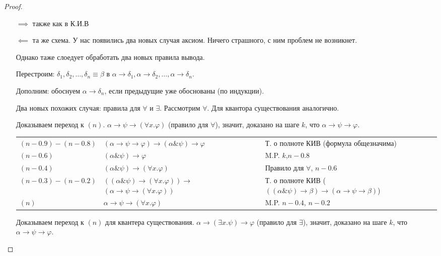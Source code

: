 \begin{proof}
    \begin{itemize}
        \item []
        \item [$\implies $] также как в К.И.В
        \item [$\impliedby $] та же схема. У нас появились два новых случая аксиом. Ничего страшного, с ним проблем не возникнет.

Однако таже слоедует обработать два новых правила вывода.

Перестроим: $\delta_1, \delta_2, \dots, \delta_n \equiv \beta$ в $\alpha\rightarrow\delta_1, \alpha\rightarrow\delta_2, \dots, \alpha\rightarrow\delta_n$.

Дополним: обоснуем $\alpha\rightarrow\delta_n$, если предыдущие уже обоснованы (по индукции).

Два новых похожих случая: правила для $\forall$ и $\exists$. Рассмотрим $\forall$. Для квантора существования аналогично.

Доказываем переход к $(n)$. $\alpha\rightarrow\psi\rightarrow(\forall x.\varphi)$ (правило для $\forall$), значит, доказано
на шаге $k$, что $\alpha\rightarrow\psi\rightarrow\varphi$.

\begin{tabular}[t]{p{2.8cm} p{4.6cm} p{7cm}}
$(n-0.9)-(n-0.8)$ &
$(\alpha\rightarrow\psi\rightarrow\varphi)\rightarrow(\alpha\&\psi)\rightarrow\varphi$ & Т. о полноте КИВ (формула общезначима)\\
$(n-0.6)$ & $(\alpha \& \psi)\rightarrow\varphi$ & M.P. $k$,$n-0.8$\\
$(n-0.4)$ & $(\alpha \& \psi)\rightarrow(\forall x.\varphi)$ & Правило для $\forall$, $n-0.6$\\
\parbox{2.8cm}{$(n-0.3)-(n-0.2)$\\} & \parbox{4.6cm}{$((\alpha\&\psi)\rightarrow(\forall x.\varphi))\rightarrow$\\$(\alpha\rightarrow\psi\rightarrow(\forall x.\varphi))$} & \parbox{7cm}{Т. о полноте КИВ \\($((\alpha\&\psi)\rightarrow\beta)\rightarrow(\alpha\rightarrow\psi\rightarrow\beta)$)}\\
$(n)$ & $\alpha\rightarrow\psi\rightarrow(\forall x.\varphi)$ & M.P. $n-0.4$, $n-0.2$
\end{tabular}

Доказываем переход к $(n)$ для квантера существования. $\alpha\rightarrow(\exists x.\psi)\rightarrow \varphi$ (правило для $\exists$), значит, доказано
на шаге $k$, что $\alpha\rightarrow\psi\rightarrow\varphi$.


\end{itemize}
\end{proof}
